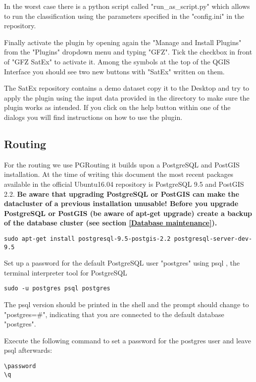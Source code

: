 \documentclass{article}
\begin{document}
In the worst case there is a python script called
"run\_as\_script.py" which allows to run the classification
using the parameters specified in the "config.ini" in the repository.
 
Finally activate the plugin by opening again the "Manage and Install Plugins" from the "Plugins" dropdown menu and typing "GFZ". Tick the
checkbox in front of "GFZ SatEx" to activate it. Among the symbols
at the top of the QGIS Interface you should see two new buttons
with "SatEx" written on them.

The SatEx repository contains a demo dataset copy it to the Desktop
and try to apply the plugin using the input data provided
in the directory to make sure the plugin works as intended. If
you click on the help button within one of
the dialogs you will find instructions on how to use
the plugin.

\subsection{Routing}
For the routing we use PGRouting it builds upon a PostgreSQL and 
PostGIS installation.
 At the time
of writing this document the most recent packages available in
the official Ubuntu16.04 repository is PostgreSQL 9.5 and PostGIS 2.2.
\textbf{Be aware that upgrading PostgreSQL or PostGIS can make the 
datacluster of a previous installation unusable! Before you
upgrade PostgreSQL or PostGIS (be aware of apt-get upgrade) create a backup of the database cluster (see section \ref{Database maintenance}).}

\begin{verbatim}
sudo apt-get install postgresql-9.5-postgis-2.2 postgresql-server-dev-9.5
\end{verbatim}

Set up a password for the default PostgreSQL user "postgres" using psql
, the terminal interpreter tool for PostgreSQL
\begin{verbatim}
sudo -u postgres psql postgres
\end{verbatim}
The psql version should be printed in the shell and the 
prompt should change to "postgres=\#", indicating that you are connected
to the default database "postgres".  

Execute the following command to set a password for the postgres user
and leave psql afterwards:

\begin{verbatim}
\password
\q
\end{verbatim}
\end{document}
